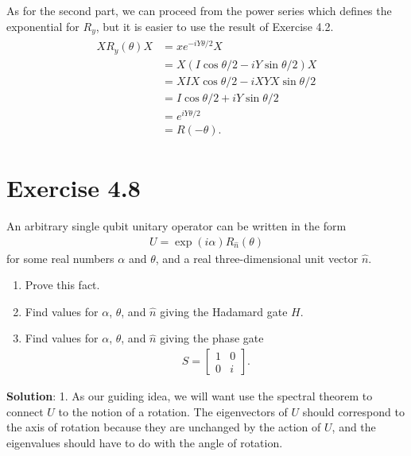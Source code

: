 \documentclass{book}
\begin{document}
    As for the second part, we can proceed from the power series which defines the exponential for $R_y$, but it is easier to use the result of Exercise 4.2.
    \begin{align}
    \begin{aligned}
        X R_y(\theta) X &= x e^{-i Y \theta /2} X \\
        &= X (I \cos \theta/2 - iY\sin\theta/2 ) X \\
        &= XIX \cos\theta/2 - i XYX\sin\theta/2 \\
        &= I \cos\theta/2 + i Y \sin\theta/2 \\
        &= e^{i Y \theta/2} \\
        &= R(-\theta).
    \end{aligned}
    \end{align}

\section*{Exercise 4.8}
    An arbitrary single qubit unitary operator can be written in the form
    \begin{align}
        U = \exp(i\alpha) R_{\hat{n}}(\theta)
    \end{align}
    for some real numbers $\alpha$ and $\theta$, and a real three-dimensional unit vector $\hat{n}$.
    
    \begin{enumerate}
        \item Prove this fact.
        \item Find values for $\alpha$, $\theta$, and $\hat{n}$ giving the Hadamard gate $H$.
        \item Find values for $\alpha$, $\theta$, and $\hat{n}$ giving the phase gate
        \begin{align}
            S = \begin{bmatrix}
                1 & 0 \\
                0 & i
            \end{bmatrix}.
        \end{align}
    \end{enumerate}
    
    \textbf{Solution}: 1. As our guiding idea, we will want use the spectral theorem to connect $U$ to the notion of a rotation. The eigenvectors of $U$ should correspond to the axis of rotation because they are unchanged by the action of $U$, and the eigenvalues should have to do with the angle of rotation. 
    
\end{document}
